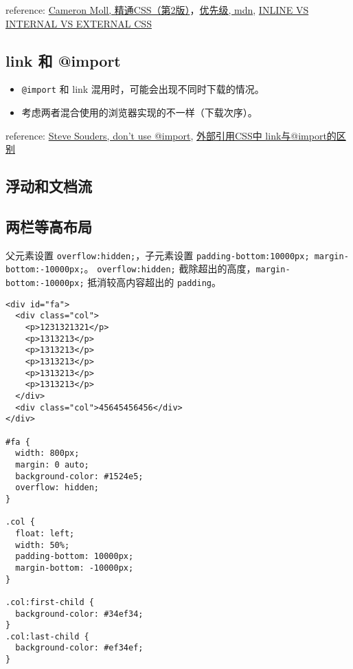 reference: \href{http://book.douban.com/subject/4736167/}{Cameron Moll, 精通CSS（第2版）}，\href{https://developer.mozilla.org/zh-CN/docs/Web/CSS/Specificity}{优先级, mdn}, \href{https://vineetgupta22.wordpress.com/2011/07/09/inline-vs-internal-vs-external-css/}{INLINE VS INTERNAL VS EXTERNAL CSS}

\subsection{link 和 @import}\hypertarget{link--import}{}\label{link--import}

\begin{itemize}
\item \texttt{@import} 和 link 混用时，可能会出现不同时下载的情况。
\item 考虑两者混合使用的浏览器实现的不一样（下载次序）。
\end{itemize}

reference: \href{http://www.stevesouders.com/blog/2009/04/09/dont-use-import/}{Steve Souders, don’t use @import}, \href{http://www.dreamdu.com/blog/2007/05/11/css\_link\_import/}{外部引用CSS中 link与@import的区别}

\subsection{浮动和文档流}\hypertarget{section-3}{}\label{section-3}

\subsection{两栏等高布局}\hypertarget{section-4}{}\label{section-4}

父元素设置 \texttt{overflow:hidden;}，子元素设置 \texttt{padding-bottom:10000px; margin-bottom:-10000px;}。
\texttt{overflow:hidden;} 截除超出的高度，\texttt{margin-bottom:-10000px;} 抵消较高内容超出的 \texttt{padding}。

\begin{verbatim}<div id="fa">
  <div class="col">
    <p>1231321321</p>
    <p>1313213</p>
    <p>1313213</p>
    <p>1313213</p>
    <p>1313213</p>
    <p>1313213</p>
  </div>
  <div class="col">45645456456</div>
</div>

#fa {
  width: 800px;
  margin: 0 auto;
  background-color: #1524e5;
  overflow: hidden;
}

.col {
  float: left;
  width: 50%;
  padding-bottom: 10000px;
  margin-bottom: -10000px;
}

.col:first-child {
  background-color: #34ef34;
}
.col:last-child {
  background-color: #ef34ef;
}
\end{verbatim}


